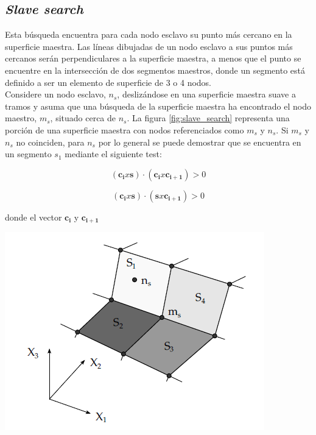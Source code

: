 \subsection{\textit{Slave search}}

Esta búsqueda encuentra para cada nodo esclavo su punto más cercano en la superficie maestra. 
Las líneas dibujadas de un nodo esclavo a sus puntos más cercanos serán perpendiculares a la 
superficie maestra, a menos que el punto se encuentre en la intersección de dos segmentos 
maestros, donde un segmento está definido a ser un elemento de superficie de 3 o 4 nodos.\\

Considere un nodo esclavo, $n_s$, deslizándose en una superficie maestra suave a tramos y 
asuma que una búsqueda de la superficie maestra ha encontrado el nodo maestro, $m_s$, 
situado cerca de $n_s$. La figura \ref{fig:slave_search} representa una porción 
de una superficie maestra con nodos referenciados como $m_s$ y $n_s$. Si $m_s$ 
y $n_s$ no coinciden, para $n_s$ por lo general se puede demostrar que se encuentra 
en un segmento $s_1$  mediante el siguiente test:

\begin{equation}
(\mathbf{c_i} x \mathbf{s}) \cdot (\mathbf{c_i} x \mathbf{c_{i+1}}) > 0
\end{equation}

\begin{equation}
(\mathbf{c_i} x \mathbf{s}) \cdot (\mathbf{s} x \mathbf{c_{i+1}}) > 0
\end{equation}

donde el vector $\mathbf{c_i}$ y $\mathbf{c_{i+1}}$

\begin{center}
\includegraphics[scale=0.6]{src/ch2/slave_search.png}
\label{fig:slave_search}
\end{center}


